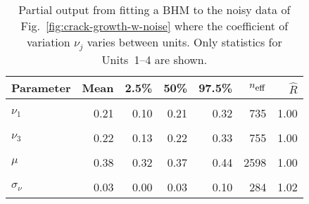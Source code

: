 \begin{table}
\centering
\caption{\label{tab:pp_nu}Partial output from fitting a BHM to the noisy data of Fig.~\ref{fig:crack-growth-w-noise} where the coefficient of variation $\nu_j$ varies between units. Only statistics for Units~1--4 are shown.}
\centering
\begin{tabular}[t]{lrrrrrr}
\toprule
Parameter & Mean & 2.5\% & 50\% & 97.5\% & $n_{\small{\mbox{eff}}}$ & $\hat{R}$\\
\midrule
\cellcolor{gray!10}{$\sigma$} & \cellcolor{gray!10}{0.03} & \cellcolor{gray!10}{0.02} & \cellcolor{gray!10}{0.03} & \cellcolor{gray!10}{0.04} & \cellcolor{gray!10}{1856} & \cellcolor{gray!10}{1.00}\\
$\nu_1$ & 0.21 & 0.10 & 0.21 & 0.32 & 735 & 1.00\\
\cellcolor{gray!10}{$\nu_2$} & \cellcolor{gray!10}{0.22} & \cellcolor{gray!10}{0.14} & \cellcolor{gray!10}{0.22} & \cellcolor{gray!10}{0.33} & \cellcolor{gray!10}{910} & \cellcolor{gray!10}{1.01}\\
$\nu_3$ & 0.22 & 0.13 & 0.22 & 0.33 & 755 & 1.00\\
\cellcolor{gray!10}{$\nu_4$} & \cellcolor{gray!10}{0.22} & \cellcolor{gray!10}{0.13} & \cellcolor{gray!10}{0.22} & \cellcolor{gray!10}{0.33} & \cellcolor{gray!10}{811} & \cellcolor{gray!10}{1.00}\\
\addlinespace
$\mu$ & 0.38 & 0.32 & 0.37 & 0.44 & 2598 & 1.00\\
\cellcolor{gray!10}{$\mu_\nu$} & \cellcolor{gray!10}{0.22} & \cellcolor{gray!10}{0.15} & \cellcolor{gray!10}{0.22} & \cellcolor{gray!10}{0.31} & \cellcolor{gray!10}{598} & \cellcolor{gray!10}{1.00}\\
$\sigma_\nu$ & 0.03 & 0.00 & 0.03 & 0.10 & 284 & 1.02\\
\bottomrule
\end{tabular}
\end{table}
